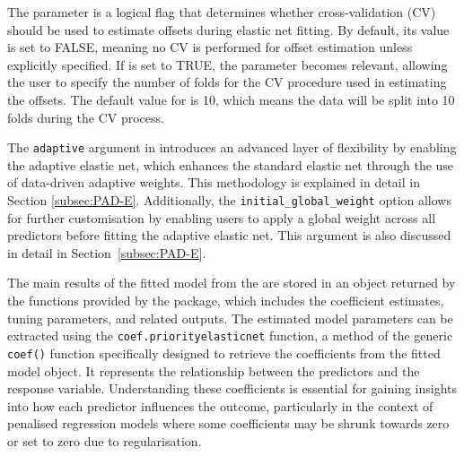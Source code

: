The  parameter is a logical flag that determines whether cross-validation (CV) should be used to estimate offsets during elastic net fitting. By default, its value is set to FALSE, meaning no CV is performed for offset estimation unless explicitly specified. If  is set to TRUE, the  parameter becomes relevant, allowing the user to specify the number of folds for the CV procedure used in estimating the offsets. The default value for  is 10, which means the data will be split into 10 folds during the CV process.

The \texttt{adaptive} argument in  introduces an advanced layer of flexibility by enabling the adaptive elastic net, which enhances the standard elastic net through the use of data-driven adaptive weights. This methodology is explained in detail in Section \ref{subsec:PAD-E}. Additionally, the \texttt{initial\_global\_weight} option allows for further customisation by enabling users to apply a global weight across all predictors before fitting the adaptive elastic net. This argument is also discussed in detail in Section~\ref{subsec:PAD-E}.

The main results of the fitted model from the  are stored in an object returned by the functions provided by the package, which includes the coefficient estimates, tuning parameters, and related outputs. The estimated model parameters can be extracted using the \texttt{coef.priorityelasticnet} function, a method of the generic \texttt{coef()} function specifically designed to retrieve the coefficients from the fitted model object. It represents the relationship between the predictors and the response variable. Understanding these coefficients is essential for gaining insights into how each predictor influences the outcome, particularly in the context of penalised regression models where some coefficients may be shrunk towards zero or set to zero due to regularisation.


